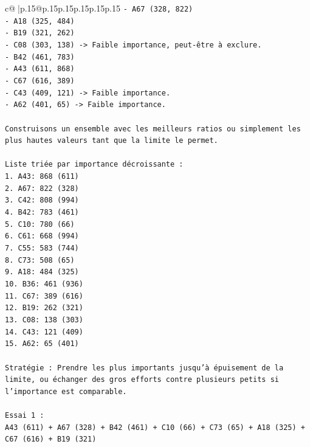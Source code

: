 \documentclass{article}
\begin{document}
{\begin{supertabular}{c@{$\;$}|p{.15\linewidth}@{}p{.15\linewidth}p{.15\linewidth}p{.15\linewidth}p{.15\linewidth}p{.15\linewidth}}
{{{\texttt{{-} A67 (328, 822)} \\
\texttt{{-} A18 (325, 484)} \\
\texttt{{-} B19 (321, 262)} \\
\texttt{{-} C08 (303, 138) {-}> Faible importance, peut{-}être à exclure.} \\
\texttt{{-} B42 (461, 783)} \\
\texttt{{-} A43 (611, 868)} \\
\texttt{{-} C67 (616, 389)} \\
\texttt{{-} C43 (409, 121) {-}> Faible importance.} \\
\texttt{{-} A62 (401, 65) {-}> Faible importance.} \\
\\ 
\texttt{Construisons un ensemble avec les meilleurs ratios ou simplement les plus hautes valeurs tant que la limite le permet.} \\
\\ 
\texttt{Liste triée par importance décroissante :} \\
\texttt{1. A43: 868 (611)} \\
\texttt{2. A67: 822 (328)} \\
\texttt{3. C42: 808 (994)} \\
\texttt{4. B42: 783 (461)} \\
\texttt{5. C10: 780 (66)} \\
\texttt{6. C61: 668 (994)} \\
\texttt{7. C55: 583 (744)} \\
\texttt{8. C73: 508 (65)} \\
\texttt{9. A18: 484 (325)} \\
\texttt{10. B36: 461 (936)} \\
\texttt{11. C67: 389 (616)} \\
\texttt{12. B19: 262 (321)} \\
\texttt{13. C08: 138 (303)} \\
\texttt{14. C43: 121 (409)} \\
\texttt{15. A62: 65 (401)} \\
\\ 
\texttt{Stratégie : Prendre les plus importants jusqu'à épuisement de la limite, ou échanger des gros efforts contre plusieurs petits si l'importance est comparable.} \\
\\ 
\texttt{Essai 1 :} \\
\texttt{A43 (611) + A67 (328) + B42 (461) + C10 (66) + C73 (65) + A18 (325) + C67 (616) + B19 (321)} \\
}}}
\end{supertabular}}
\end{document}
